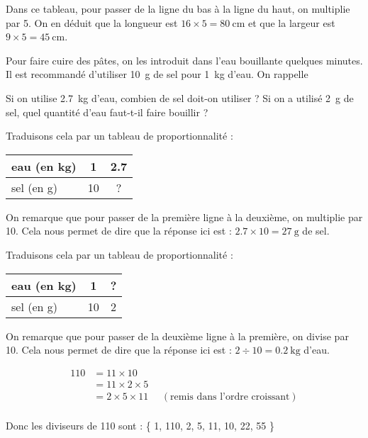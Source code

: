 \documentclass[../Cours.tex]{subfiles}
\begin{document}
\begin{questions}
    Dans ce tableau, pour passer de la ligne du bas à la ligne du haut, on multiplie par 5. On en déduit que la longueur est $16 \times 5 = \qty{80}{\centi\metre}$ et que la largeur est $9 \times 5 = \qty{45}{\centi\metre}$.

    Pour faire cuire des pâtes, on les introduit dans l'eau bouillante quelques minutes. Il est recommandé d'utiliser \qty{10}{\gram} de sel pour \qty{1}{\kilo\gram} d'eau. On rappelle

    \question Si on utilise \qty{2.7}{\kilo\gram} d'eau, combien de sel doit-on utiliser ?
    \question Si on a utilisé \qty{2}{\gram} de sel, quel quantité d'eau faut-t-il faire bouillir ?

    \question 
    Traduisons cela par un tableau de proportionnalité : 
    \begin{center}
        \begin{tabularx}{0.5\linewidth}{|l|C|C|}
            eau (en \unit{\kilo\gram}) & 1 & \num{2.7} \\\hline
            sel (en \unit{\gram}) & 10 & ? \\\hline
        \end{tabularx}
    \end{center}

    On remarque que pour passer de la première ligne à la deuxième, on multiplie par 10. Cela nous permet de dire que la réponse ici est : $\num{2.7} \times 10 = \qty{27}{\gram}$ de sel.

    \question 
    Traduisons cela par un tableau de proportionnalité : 
    \begin{center}
        \begin{tabularx}{0.5\linewidth}{|l|C|C|}
            eau (en \unit{\kilo\gram}) & 1 & ? \\\hline
            sel (en \unit{\gram}) & 10 & 2 \\\hline
        \end{tabularx}
    \end{center}

    On remarque que pour passer de la deuxième ligne à la première, on divise par 10. Cela nous permet de dire que la réponse ici est : $\num{2} \div 10 = \qty{0.2}{\kilo\gram}$ d'eau.


    \question 
    \begin{align*}
        110 &= 11 \times 10 \\
        &= 11 \times 2 \times 5 \\
        &= 2 \times 5 \times 11 ~~~~~~(\mbox{remis dans l'ordre croissant})\\
    \end{align*}

    Donc les diviseurs de 110 sont : \{ 1, 110, 2, 5, 11, 10, 22, 55 \}
        
    
\end{questions}
\end{document}
